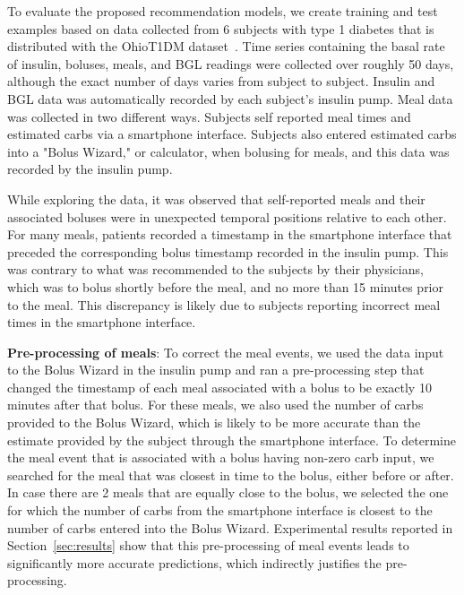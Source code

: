 \documentclass[graybox]{svmult}
\begin{document}
To evaluate the proposed recommendation models, we create training and test examples based on data collected from 6 subjects with type 1 diabetes that is distributed with the OhioT1DM dataset~\cite{ohiot1dm:marling:kdh20}. Time series containing the basal rate of insulin, boluses, meals, and BGL readings were collected over roughly 50 days, although the exact number of days varies from subject to subject. 
Insulin and BGL data was automatically recorded by each subject's insulin pump.  Meal data was collected in two different ways.  Subjects self reported meal times and estimated carbs via a smartphone interface.  Subjects also entered estimated carbs into a "Bolus Wizard," or calculator, when bolusing for meals, and this data was recorded by the insulin pump.

While exploring the data, it was observed that self-reported meals and their associated boluses were in unexpected temporal positions relative to each other. For many meals, patients recorded a timestamp in the smartphone interface that preceded the corresponding bolus timestamp recorded in the insulin pump. This was contrary to what was recommended to the subjects by their physicians, which was to bolus shortly before the meal, and no more than 15 minutes prior to the meal. This discrepancy is likely due to subjects reporting incorrect meal times in the smartphone interface.

{\bf Pre-processing of meals}: To correct the meal events, we used the data input to the Bolus Wizard in the insulin pump and ran a pre-processing step that changed the timestamp of each meal associated with a bolus to be exactly 10 minutes after that bolus. For these meals, we also used the number of carbs provided to the Bolus Wizard, which is likely to be more accurate than the estimate provided by the subject through the smartphone interface. To determine the meal event that is associated with a bolus having non-zero carb input, we searched for the meal that was closest in time to the bolus, either before or after. In case there are 2 meals that are equally close to the bolus, we selected the one for which the number of carbs from the smartphone interface is closest to the number of carbs entered into the Bolus Wizard. Experimental results reported in Section~\ref{sec:results} show that this pre-processing of meal events leads to significantly more accurate predictions, which indirectly justifies the pre-processing.
\end{document}
